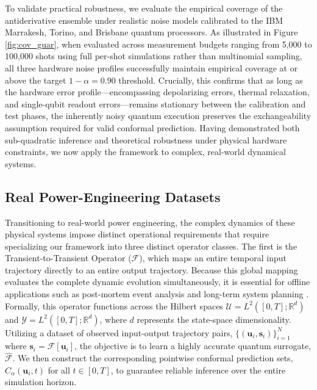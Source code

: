 \documentclass{iopjournal}
\begin{document}
To validate practical robustness, we evaluate the empirical coverage of the antiderivative ensemble under realistic noise models calibrated to the IBM Marrakesh, Torino, and Brisbane quantum processors. As illustrated in Figure \ref{fig:cov_guar}, when evaluated across measurement budgets ranging from 5,000 to 100,000 shots using full per-shot simulations rather than multinomial sampling, all three hardware noise profiles successfully maintain empirical coverage at or above the target $1-\alpha=0.90$ threshold. Crucially, this confirms that as long as the hardware error profile—encompassing depolarizing errors, thermal relaxation, and single-qubit readout errors—remains stationary between the calibration and test phases, the inherently noisy quantum execution preserves the exchangeability assumption required for valid conformal prediction. Having demonstrated both sub-quadratic inference and theoretical robustness under physical hardware constraints, we now apply the framework to complex, real-world dynamical systems.



\subsection{Real Power-Engineering Datasets}

Transitioning to real-world power engineering, the complex dynamics of these physical systems impose distinct operational requirements that require specializing our framework into three distinct operator classes. The first is the Transient-to-Transient Operator ($\mathcal{F}$), which maps an entire temporal input trajectory directly to an entire output trajectory. Because this global mapping evaluates the complete dynamic evolution simultaneously, it is essential for offline applications such as post-mortem event analysis and long-term system planning \cite{kwatny2016psdynamics, kundur2004psdynamics}. Formally, this operator functions across the Hilbert spaces $\mathcal{U} = L^2([0,T]; \mathbb{R}^d)$ and $\mathcal{Y} = L^2([0,T]; \mathbb{R}^d)$, where $d$ represents the state-space dimensionality. Utilizing a dataset of observed input-output trajectory pairs, $\{(\mathbf{u}_i, \mathbf{s}_i)\}_{i=1}^N$ where $\mathbf{s}_i = \mathcal{F}[\mathbf{u}_i]$, the objective is to learn a highly accurate quantum surrogate, $\hat{\mathcal{F}}$. We then construct the corresponding pointwise conformal prediction sets, $C_\alpha(\mathbf{u}_i, t)$ for all $t \in [0, T]$, to guarantee reliable inference over the entire simulation horizon.
\end{document}
